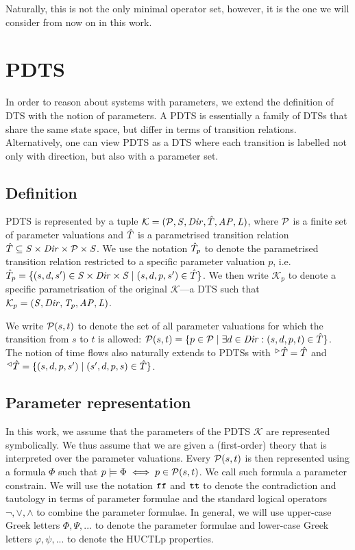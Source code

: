 Naturally, this is not the only minimal operator set, however, it is the one we will consider from now on in this work.

\section{\Acl{PDTS}}

In order to reason about systems with parameters, we extend the definition of \ac{DTS} with the notion of parameters. A \ac{PDTS} is essentially a family of \acp{DTS} that share the same state space, but differ in terms of transition relations. Alternatively, one can view \ac{PDTS} as a \ac{DTS} where each transition is labelled not only with direction, but also with a parameter set.

\subsection{Definition}

\Acl{PDTS} is represented by a tuple $\mathcal{K} = (\mathcal{P}, \mathit{S}, \mathit{Dir}, \hat{T}, \mathit{AP}, \mathit{L})$, where $\mathcal{P}$ is a finite set of parameter valuations and $\hat{T}$ is a parametrised transition relation $\hat{T} \subseteq \mathit{S} \times \mathit{Dir} \times \mathcal{P} \times \mathit{S}$. We use the notation $\hat{T}_p$ to denote the parametrised transition relation restricted to a specific parameter valuation $p$, i.e. $\hat{T}_p = \{ (s, d, s') \in \mathit{S} \times \mathit{Dir} \times \mathit{S} \mid (s, d, p, s') \in \hat{T} \}$.  We then write $\mathcal{K}_p$ to denote a specific parametrisation of the original $\mathcal{K}$—a \ac{DTS} such that $\mathcal{K}_p = (\mathit{S}, \mathit{Dir}, \mathit{T}_p, \mathit{AP}, \mathit{L})$. 

We	 write $\mathcal{P}(s, t)$ to denote the set of all parameter valuations for which the transition from $s$ to $t$ is allowed: $\mathcal{P}(s, t) = \{ p \in \mathcal{P} \mid \exists d \in \mathit{Dir} : (s, d, p, t) \in \hat{T} \}$. The notion of time flows also naturally extends to \acp{PDTS} with ${}^\vartriangleright\hat{T} = \hat{T}$ and ${}^\vartriangleleft\hat{T} = \{ (s, d, p, s') \mid (s', d, p, s) \in \hat{T} \}$.

\subsection{Parameter representation}
\label{sec:paramRepresentation}

In this work, we assume that the parameters of the \ac{PDTS} $\mathcal{K}$ are represented symbolically. We thus assume that we are given a (first-order) theory that is interpreted over the parameter valuations. Every $\mathcal{P}(s, t)$ is then represented using a formula $\Phi$ such that $p \models \Phi \iff p \in \mathcal{P}(s, t)$. We call such formula a parameter constrain. We will use the notation $\texttt{ff}$ and $\texttt{tt}$ to denote the contradiction and tautology in terms of parameter formulae and the standard logical operators $\neg, \lor, \land$ to combine the parameter formulae. In general, we will use upper-case Greek letters $\Phi, \Psi, ...$ to denote the parameter formulae and lower-case Greek letters $\varphi, \psi, ...$ to denote the \ac{HUCTLp} properties.

